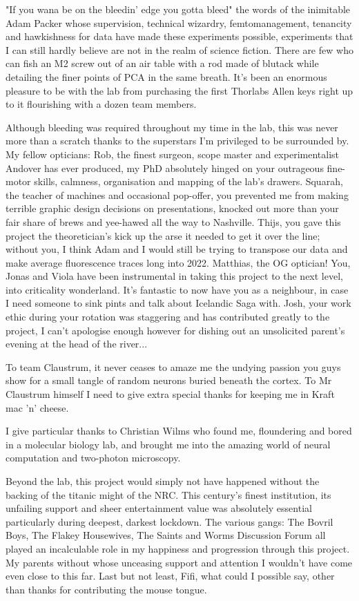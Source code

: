 "If you wana be on the bleedin' edge you gotta bleed" the words of the inimitable Adam Packer whose supervision, technical wizardry, femtomanagement, tenancity and hawkishness for data have made these experiments possible, experiments that I can still hardly believe are not in the realm of science fiction. There are few who can fish an M2 screw out of an air table with a rod made of blutack while detailing the finer points of PCA in the same breath. It's been an enormous pleasure to be with the lab from purchasing the first Thorlabs Allen keys right up to it flourishing with a dozen team members. 

Although bleeding was required throughout my time in the lab, this was never more than a scratch thanks to the superstars I'm privileged to be surrounded by. My fellow opticians: Rob, the finest surgeon, scope master and experimentalist Andover has ever produced, my PhD absolutely hinged on your outrageous fine-motor skills, calmness, organisation and mapping of the lab's drawers. Squarah, the teacher of machines and occasional pop-offer, you prevented me from making terrible graphic design decisions on presentations, knocked out more than your fair share of brews and yee-hawed all the way to Nashville. Thijs, you gave this project the theoretician's kick up the arse it needed to get it over the line; without you, I think Adam and I would still be trying to transpose our data and make average fluorescence traces long into 2022. Matthias, the OG optician! You, Jonas and Viola have been instrumental in taking this project to the next level, into criticality wonderland. It's fantastic to now have you as a neighbour, in case I need someone to sink pints and talk about Icelandic Saga with. Josh, your work ethic during your rotation was staggering and has contributed greatly to the project, I can't apologise enough however for dishing out an unsolicited parent's evening at the head of the river...

To team Claustrum, it never ceases to amaze me the undying passion you guys show for a small tangle of random neurons buried beneath the cortex. To Mr Claustrum himself I need to give extra special thanks for keeping me in Kraft mac 'n' cheese. 

I give particular thanks to Christian Wilms who found me, floundering and bored in a molecular biology lab, and brought me into the amazing world of neural computation and two-photon microscopy.

Beyond the lab, this project would simply not have happened without the backing of the titanic might of the NRC. This century's finest institution, its unfailing support and sheer entertainment value was absolutely essential particularly during deepest, darkest lockdown. The various gangs: The Bovril Boys, The Flakey Housewives, The Saints and Worms Discussion Forum all played an incalculable role in my happiness and progression through this project. My parents without whose unceasing support and attention I wouldn't have come even close to this far. Last but not least, Fifi, what could I possible say, other than thanks for contributing the mouse tongue.


